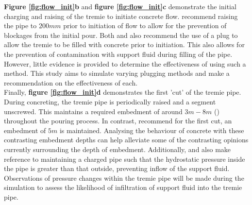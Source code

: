\noindent
{\bfseries
Figure \ref{fig:flow_init}b} and {\bfseries figure \ref{fig:flow_init}c}  demonstrate the initial charging and raising of the tremie to initiate concrete flow.  recommend raising the pipe to $200mm$ prior to initiation of flow to allow for the prevention of blockages from the initial pour. Both  and  also recommend the use of a plug to allow the tremie to be filled with concrete prior to initiation. This also allows for the prevention of contamination with support fluid during filling of the pipe. However, little evidence is provided to determine the effectiveness of using such a method. This study aims to simulate varying plugging methods and make a recommendation on the effectiveness of each.\\

\noindent
Finally, {\bfseries figure \ref{fig:flow_init}d}  demonstrates the first 'cut' of the tremie pipe. During concreting, the tremie pipe is periodically raised and a segment unscrewed. This maintains a required embedment of around $3m-8m$ (\citeauthor{BS1536}) throughout the pouring process. In contrast,  recommend for the first cut, an embedment of $5m$ is maintained. Analysing the behaviour of concrete with these contrasting embedment depths can help alleviate some of the contrasting opinions currently surrounding the depth of embedment. Additionally,  and  also make reference to maintaining a charged pipe such that the hydrostatic pressure inside the pipe is greater than that outside, preventing inflow of the support fluid. Observations of pressure changes within the tremie pipe will be made during the simulation to assess the likelihood of infiltration of support fluid into the tremie pipe.

